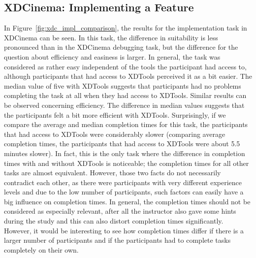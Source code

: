 \subsection{XDCinema: Implementing a Feature}

In Figure~\ref{fig:xdc_impl_comparison}, the results for the implementation task in XDCinema can be seen. In this task, the difference in suitability is less pronounced than in the XDCinema debugging task, but the difference for the question about efficiency and easiness is larger. In general, the task was considered as rather easy independent of the tools the participant had access to, although participants that had access to XDTools perceived it as a bit easier. The median value of five with XDTools suggests that participants had no problems completing the task at all when they had access to XDTools. Similar results can be observed concerning efficiency. The difference in median values suggests that the participants felt a bit more efficient with XDTools. Surprisingly, if we compare the average and median completion times for this task, the participants that had access to XDTools were considerably slower (comparing average completion times, the participants that had access to XDTools were about 5.5 minutes slower). In fact, this is the only task where the difference in completion times with and without XDTools is noticeable; the completion times for all other tasks are almost equivalent. However, those two facts do not necessarily contradict each other, as there were participants with very different experience levels and due to the low number of participants, such factors can easily have a big influence on completion times. In general, the completion times should not be considered as especially relevant, after all the instructor also gave some hints during the study and this can also distort completion times significantly. However, it would be interesting to see how completion times differ if there is a larger number of participants and if the participants had to complete tasks completely on their own. 

